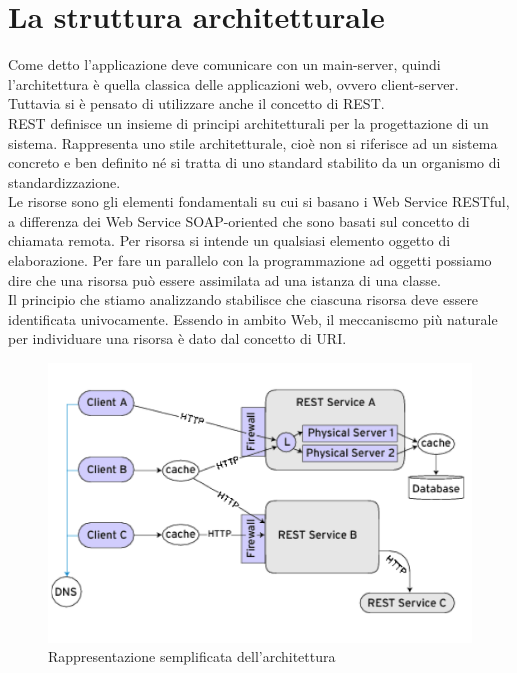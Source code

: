 \section{La struttura architetturale}
Come detto l'applicazione deve comunicare con un main-server, quindi l'architettura è quella classica delle applicazioni web, ovvero client-server.	 Tuttavia si è pensato di utilizzare anche il concetto di REST.\\
REST \cite{REST} definisce un insieme di principi architetturali per la progettazione di un sistema. Rappresenta uno stile architetturale, cioè non si riferisce ad un sistema concreto e ben definito né si tratta di uno standard stabilito da un organismo di standardizzazione. \\ 
Le risorse sono gli elementi fondamentali su cui si basano i Web Service RESTful, a differenza dei Web Service SOAP-oriented che sono basati sul concetto di chiamata remota. Per risorsa si intende un qualsiasi elemento oggetto di elaborazione. Per fare un parallelo con la programmazione ad oggetti possiamo dire che una risorsa può essere assimilata ad una istanza di una classe.\\
Il principio che stiamo analizzando stabilisce che ciascuna risorsa deve essere identificata univocamente. Essendo in ambito Web, il meccaniscmo più naturale per individuare una risorsa è dato dal concetto di URI. \\
\begin{figure}[H]
	\centering
	\includegraphics[scale=0.5]{Implementazione/rest.png}
	\caption{Rappresentazione semplificata dell'architettura }
	\label{fig:rest}
\end{figure}

